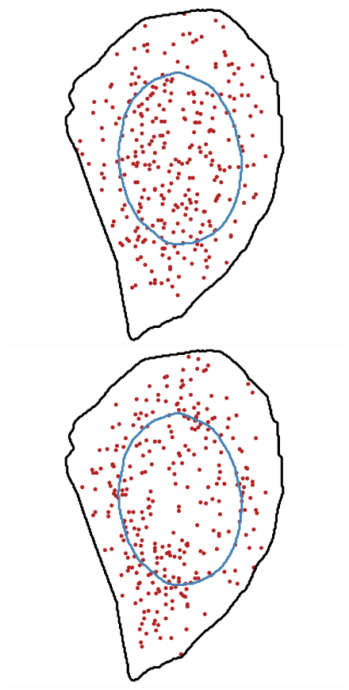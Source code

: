 \begin{figure}[]
	\centering
		\includegraphics[width=\linewidth]{figures/chapter4/simulation_perinuclear_10}
	\endminipage\hfill
		\includegraphics[width=\linewidth]{figures/chapter4/simulation_perinuclear_50}

\end{figure}
